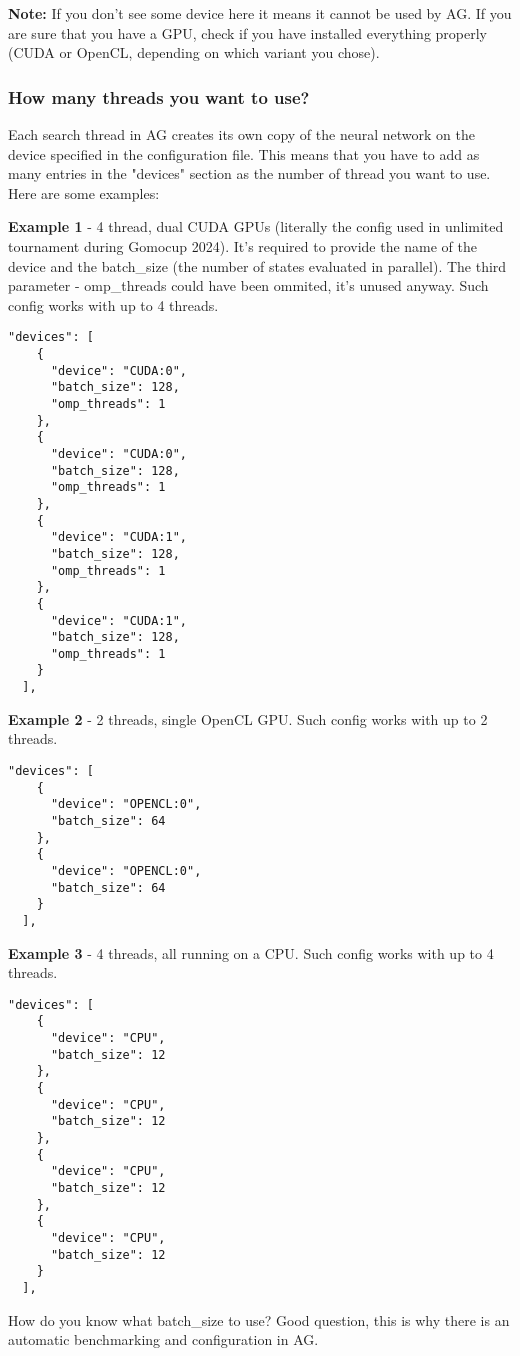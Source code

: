 \documentclass[12pt,a4paper]{article}
\begin{document}
\textbf{Note:} If you don't see some device here it means it cannot be used by AG. If you are sure that you have a GPU, check if you have installed everything properly (CUDA or OpenCL, depending on which variant you chose).

\subsubsection{How many threads you want to use?}
Each search thread in AG creates its own copy of the neural network on the device specified in the configuration file. This means that you have to add as many entries in the "devices" section as the number of thread you want to use. Here are some examples:

\textbf{Example 1} - 4 thread, dual CUDA GPUs (literally the config used in unlimited tournament during Gomocup 2024). It's required to provide the name of the device and the batch{\_}size (the number of states evaluated in parallel). The third parameter - omp{\_}threads could have been ommited, it's unused anyway. Such config works with up to 4 threads.
\begin{verbatim}
"devices": [
    {
      "device": "CUDA:0",
      "batch_size": 128,
      "omp_threads": 1
    },
    {
      "device": "CUDA:0",
      "batch_size": 128,
      "omp_threads": 1
    },
    {
      "device": "CUDA:1",
      "batch_size": 128,
      "omp_threads": 1
    },
    {
      "device": "CUDA:1",
      "batch_size": 128,
      "omp_threads": 1
    }
  ],
\end{verbatim}


\textbf{Example 2} - 2 threads, single OpenCL GPU. Such config works with up to 2 threads.
\begin{verbatim}
"devices": [
    {
      "device": "OPENCL:0",
      "batch_size": 64
    },
    {
      "device": "OPENCL:0",
      "batch_size": 64
    }
  ],
\end{verbatim}

\textbf{Example 3} - 4 threads, all running on a CPU. Such config works with up to 4 threads.
\begin{verbatim}
"devices": [
    {
      "device": "CPU",
      "batch_size": 12
    },
    {
      "device": "CPU",
      "batch_size": 12
    },
    {
      "device": "CPU",
      "batch_size": 12
    },
    {
      "device": "CPU",
      "batch_size": 12
    }
  ],
\end{verbatim}
How do you know what batch{\_}size to use? Good question, this is why there is an automatic benchmarking and configuration in AG.
\end{document}
